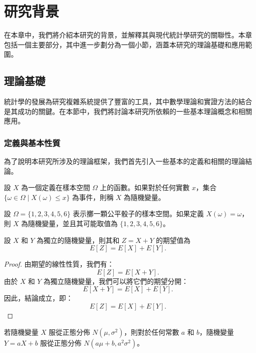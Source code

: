 \chapter{研究背景}
\label{c:background}

在本章中，我們將介紹本研究的背景，並解釋其與現代統計學研究的關聯性。本章包括一個主要部分，其中進一步劃分為一個小節，涵蓋本研究的理論基礎和應用範圍。

\section{理論基礎}

統計學的發展為研究複雜系統提供了豐富的工具，其中數學理論和實證方法的結合是其成功的關鍵。在本節中，我們將討論本研究所依賴的一些基本理論概念和相關應用。

\subsection{定義與基本性質}

為了說明本研究所涉及的理論框架，我們首先引入一些基本的定義和相關的理論結論。

\begin{definition}[隨機變量]
設 \( X \) 為一個定義在樣本空間 \( \Omega \) 上的函數。如果對於任何實數 \( x \)，集合 \( \{\omega \in \Omega \mid X(\omega) \leq x\} \) 為事件，則稱 \( X \) 為隨機變量。
\end{definition}

\begin{example}
設 \( \Omega = \{1, 2, 3, 4, 5, 6\} \) 表示擲一顆公平骰子的樣本空間。如果定義 \( X(\omega) = \omega \)，則 \( X \) 為隨機變量，並且其可能取值為 \( \{1, 2, 3, 4, 5, 6\} \)。
\end{example}

\begin{proposition}
設 \( X \) 和 \( Y \) 為獨立的隨機變量，則其和 \( Z = X + Y \) 的期望值為
\[
E[Z] = E[X] + E[Y].
\]
\end{proposition}

\begin{proof}
由期望的線性性質，我們有：
\[
E[Z] = E[X + Y].
\]
由於 \( X \) 和 \( Y \) 為獨立隨機變量，我們可以將它們的期望分開：
\[
E[X + Y] = E[X] + E[Y].
\]
因此，結論成立，即：
\[
E[Z] = E[X] + E[Y].
\]
\end{proof}

\begin{lemma}
若隨機變量 \( X \) 服從正態分佈 \( N(\mu, \sigma^2) \)，則對於任何常數 \( a \) 和 \( b \)，隨機變量 \( Y = aX + b \) 服從正態分佈 \( N(a\mu + b, a^2\sigma^2) \)。
\end{lemma}

